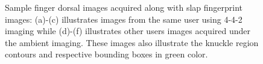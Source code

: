 \begin{figure}[ht!]
    \centering


    \caption{Sample finger dorsal images acquired along with slap fingerprint images: (a)-(c) illustrates images from the same user using 4-4-2 imaging while (d)-(f) illustrates other users images acquired under the ambient imaging. These images also illustrate the knuckle region contours and respective bounding boxes in green color.}
    \label{capture-finger-knuckle}
\end{figure}

